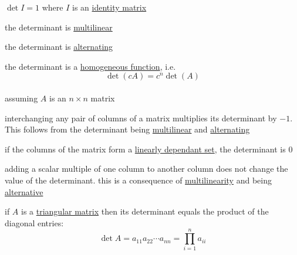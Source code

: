 \documentclass[a4paper,12pt]{article}
\begin{document}
\begin{definition}
\begin{characteristic}
\(\det I = 1\) where \(I\) is an \hyperref[sec:org15aa549]{identity matrix}\\
\end{characteristic}

\begin{characteristic}
the determinant is \href{20220801201511-multilinear.org}{multilinear}\\
\label{org7b090e0}
\end{characteristic}

\begin{characteristic}
the determinant is \href{20220801201711-alternating.org}{alternating}\\
\label{orgce6cc22}
\end{characteristic}

\begin{lemma}
the determinant is a \href{20220801201746-homogeneous_function.org}{homogeneous function}, i.e.\\
\[
  \det(cA) = c^n\det(A)
\]\\
assuming \(A\) is an \(n\times n\) matrix\\
\end{lemma}

\begin{lemma}
interchanging any pair of columns of a matrix multiplies its determinant by \(-1\). This follows from the determinant being \hyperref[org7b090e0]{multilinear} and \hyperref[orgce6cc22]{alternating}\\
\end{lemma}

\begin{lemma}
if the columns of the matrix form a \hyperref[sec:org174d95a]{linearly dependant set}, the determinant is 0\\
\end{lemma}

\begin{lemma}
adding a scalar multiple of one column to another column does not change the value of the determinant. this is a consequence of \hyperref[org7b090e0]{multilinearity} and being \hyperref[orgce6cc22]{alternative}\\
\end{lemma}

\begin{lemma}
if \(A\) is a \hyperref[sec:orgbc7aa60]{triangular matrix} then its determinant equals the product of the diagonal entries:\\
\[
  \det A = a_{11}a_{22}\cdots a_{nn} = \prod_{i=1}^n a_{ii}
\]\\
\end{lemma}


\end{definition}
\end{document}
